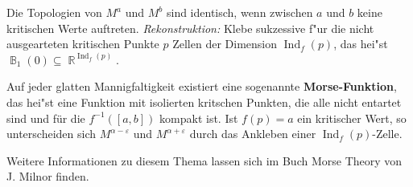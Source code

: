 \documentclass[paper=A4, twoside, chapterprefix=true, bibliography=totoc, headsepline]{scrbook}
\let\temp\phi
\let\phi\varphi
\let\varphi\temp
\let\temp\theta
\let\theta\vartheta
\let\vartheta\temp
\let\temp\epsilon
\let\epsilon\varepsilon
\let\varepsilon\temp
\let\temp\rho
\let\rho\varrho
\let\varrho\temp
\DeclareMathOperator{\R}{\mathbb{R}}
\DeclareMathOperator{\B}{\mathbb{B}} %
\DeclareMathOperator{\Ind}{Ind} %
\theoremstyle{plain}
\theoremstyle{nonumberplain}
\theoremstyle{empty}
\theoremstyle{break}
\newcommand{\CmIndex}[2][]{\ifthenelse{\isempty{#1}}{\index{#2}}{\index{#1}}#2}
\newcommand{\CmMark}[2][]{\textbf{\CmIndex[#1]{#2}}}
\newcommand{\quot}[1]{\textrm{\glqq}{#1}\textrm{\grqq}}
\begin{document}
\begin{center}
\end{center}
Die Topologien von $M^a$ und $M^b$ sind identisch, wenn zwischen $a$ und $b$ keine kritischen Werte auftreten.
\emph{\quot{Rekonstruktion}:} Klebe sukzessive f"ur die nicht ausgearteten kritischen Punkte $p$ Zellen der Dimension $\Ind_f(p)$, das hei"st $\B_1(0) \subseteq \R^{\Ind_f(p)}$.


Auf jeder glatten Mannigfaltigkeit existiert eine sogenannte \CmMark{Morse-Funktion}, das hei"st eine Funktion mit isolierten kritschen Punkten, die alle nicht entartet sind und für die $f^{-1}([a,b])$ kompakt ist.
Ist $f(p) = a$ ein kritischer Wert, so unterscheiden sich $M^{\alpha - \epsilon}$ und $M^{\alpha + \epsilon}$ durch das Ankleben einer $\Ind_f(p)$-Zelle.

Weitere Informationen zu diesem Thema lassen sich im Buch \quot{Morse Theory} von J. Milnor \cite{milnor1963morsetheo} finden.
\end{document}
